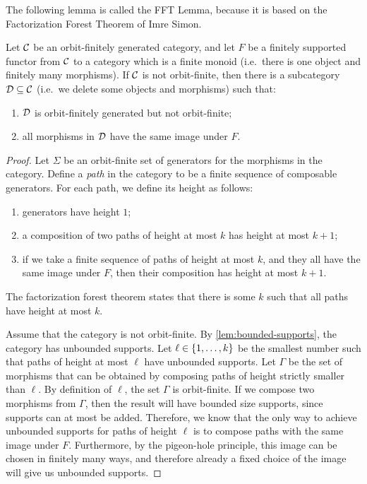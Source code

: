 The following lemma is called the FFT Lemma, because it is based on the Factorization Forest Theorem of Imre Simon. 
\begin{lemma}
     Let ${\mathcal C}$ be an orbit-finitely generated category, and let $F$ be a finitely supported functor from ${\mathcal C}$ to a category which is a finite monoid (i.e.~there is one object and finitely many morphisms). If ${\mathcal C}$ is not orbit-finite, then there is a subcategory ${\mathcal D} \subseteq {\mathcal C}$ (i.e.~we delete some objects and morphisms) such that: 
    \begin{enumerate}
        \item ${\mathcal D}$ is orbit-finitely generated but not orbit-finite;
        \item all morphisms in ${\mathcal D}$ have the same image under $F$.
    \end{enumerate}
\end{lemma}
\begin{proof}
    Let $\Sigma$ be an orbit-finite set of generators for the morphisms in the category. 
    Define a \emph{path} in the category to be a finite sequence of composable generators. For each path, we define its height as follows: 
    \begin{enumerate}
        \item generators have height $1$;
        \item a composition of two paths of height at most $k$ has height at most $k+1$;
        \item if we take a finite sequence of paths of height at most $k$,  and they all have the same image under $F$, then their composition has height at most $k+1$.
    \end{enumerate}
    The factorization forest theorem states that there is some $k$ such that all paths have height at most $k$.  

    Assume that the category is not orbit-finite. By \cref{lem:bounded-supports}, the category has unbounded supports. 
    Let $\ell \in \{1,\ldots,k\}$ be the smallest number such that paths of height at most $\ell$ have  unbounded supports.  Let $\Gamma$ be the set of morphisms that can be obtained by composing paths of height strictly smaller than $\ell$. By definition of $\ell$, the set $\Gamma$ is orbit-finite. 
    If we compose two morphisms from $\Gamma$, then the result will have bounded size supports, since supports can at most be added. Therefore, we know that the only way to achieve unbounded supports for paths of height $\ell$ is to compose paths with the same image under $F$. Furthermore, by the pigeon-hole principle, this image can be chosen in finitely many ways, and therefore already a fixed choice of the image will give us unbounded supports. 
\end{proof}


